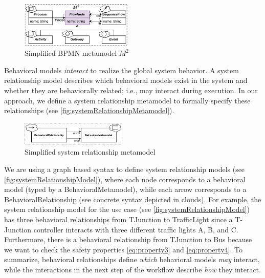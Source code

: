 \documentclass{jot}
\begin{document}
\begin{figure}[h]
    \centering
    \includegraphics[width=0.475\textwidth]{figures/bpmn_metamodel.pdf}
    \caption{Simplified BPMN metamodel $M^2$ \cite{objectmanagementgroupBusinessProcessModel2013}}
    \label{fig:bpmn_metamodel}
\end{figure}


Behavioral models \emph{interact} to realize the global system behavior.
A system relationship model describes which behavioral models exist in the system and whether they are behaviorally related; i.e., may interact during execution.
In our approach, we define a system relationship metamodel to formally specify these relationships (see \autoref{fig:systemRelationshipMetamodel}).

\begin{figure}[h]
    \centering
    \includegraphics[width=0.45\textwidth]{figures/systemRelationshipMetamodel.pdf}
    \caption{Simplified system relationship metamodel}
    \label{fig:systemRelationshipMetamodel}
\end{figure}

We are using a graph based syntax to define system relationship models (see \autoref{fig:systemRelationshipModel}), where each node corresponds to a behavioral model (typed by a \textsf{BehavioralMetamodel}), while each arrow corresponds to a \textsf{BehavioralRelationship} (see concrete syntax depicted in clouds).
For example, the system relationship model for the use case (see \autoref{fig:systemRelationshipModel}) has three behavioral relationships from \textsf{TJunction} to \textsf{TrafficLight} since a T-Junction controller interacts with three different traffic lights A, B, and C.
Furthermore, there is a behavioral relationship from \textsf{TJunction} to \textsf{Bus} because we want to check the safety properties \ref{eq:property3} and \ref{eq:property4}. 
To summarize, behavioral relationships define \textit{which} behavioral models \textit{may} interact, while the interactions in the next step of the workflow describe \textit{how} they interact.
\end{document}
